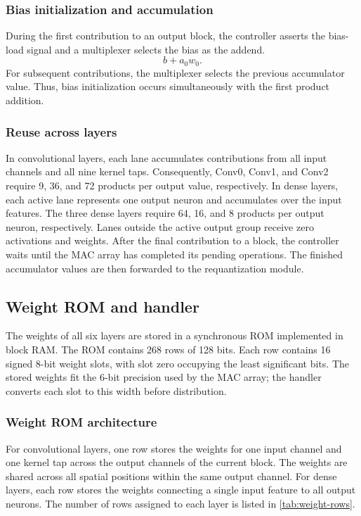 \subsubsection{Bias initialization and accumulation}
During the first contribution to an output block, the controller asserts the bias-load signal and a multiplexer selects the bias as the addend.
\[
    b + a_0 w_0.
\]
For subsequent contributions, the multiplexer selects the previous accumulator value. Thus, bias initialization occurs simultaneously with the first product addition.
\subsubsection{Reuse across layers}
In convolutional layers, each lane accumulates contributions from all input channels and all nine kernel taps. Consequently, Conv0, Conv1, and Conv2 require 9, 36, and 72 products per output value, respectively.
In dense layers, each active lane represents one output neuron and accumulates over the input features. The three dense layers require 64, 16, and 8 products per output neuron,
respectively. Lanes outside the active output group receive zero activations and weights.
After the final contribution to a block, the controller waits until the MAC array has completed its pending operations. The finished accumulator values are then forwarded to the requantization module.

\subsection{Weight ROM and handler}

The weights of all six layers are stored in a synchronous ROM implemented in block RAM. The ROM contains 268 rows of 128 bits. Each row contains 16 signed 8-bit weight slots, with slot zero occupying the least significant bits. The stored weights fit the 6-bit precision used by the MAC array; the handler converts each slot to this width before distribution.

\subsubsection{Weight ROM architecture}
For convolutional layers, one row stores the weights for one input channel and one kernel tap across the output channels of the current block. The weights are shared across all spatial positions within the same output channel.
For dense layers, each row stores the weights connecting a single input feature to all output neurons. The number of rows assigned to each layer is listed in \cref{tab:weight-rows}.

